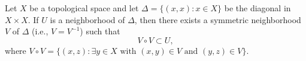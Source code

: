 Let $X$ be a topological space and let $\Delta = \{(x, x) : x \in X\}$ be the diagonal in $X \times X$. If $U$ is a neighborhood of $\Delta$, then there exists a symmetric neighborhood $V$ of $\Delta$ (i.e., $V = V^{-1}$) such that
\[
V \circ V \subset U,
\]
where $V \circ V = \{(x, z) : \exists y \in X \text{ with } (x, y) \in V \text{ and } (y, z) \in V\}$.
